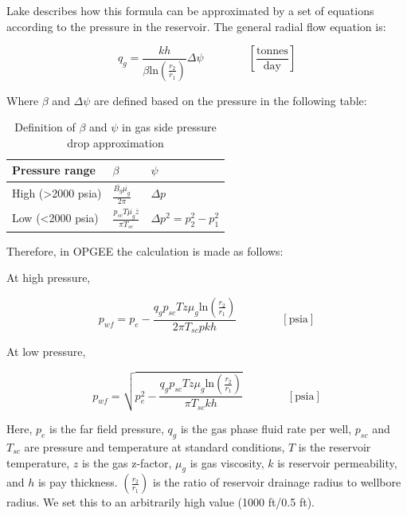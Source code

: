 \documentclass[11pt]{report}
\newcommand{\eqnunit}[1]{\quad\quad \scriptstyle{\left[\text{#1}\right]}}
\newcommand{\eqnunitfrac}[2]{\quad\quad \scriptstyle{\left[\frac{\text{#1}}{\text{#2}}\right]}}
\begin{document}
Lake describes how this formula can be approximated by a set of equations according to the pressure in the reservoir. The general radial flow equation is:

\begin{equation} 
q_{g} = \frac{k h}{\beta \text{ln}\left(\frac{r_2}{r_1} \right)} \Delta \psi \quad\quad\eqnunitfrac{tonnes}{day}
\end{equation}

Where $\beta$ and $\Delta \psi$ are defined based on the pressure in the following table:

\begin{table}[h]
\begin{scriptsize}
\caption{Definition of $\beta$ and $\psi$ in gas side pressure drop approximation}
\begin{tabular*}{0.8\columnwidth}{p{}p{}p{}}
\toprule
Pressure range & $\beta$ & $\psi$ \\
\midrule
High (>2000 psia) & $\frac{\overline{B_g}\overline{\mu_g}}{2\pi}$ & $\Delta p$ \\
Low (<2000 psia) & $\frac{p_{sc} T \overline{\mu_g} \overline{z}}{\pi T_{sc}}$ & $\Delta p^2 = p_2^2 - p_1^2$ \\
\bottomrule
\end{tabular*}
\end{scriptsize}
\end{table}

Therefore, in OPGEE the calculation is made as follows:

At high pressure,

\begin{equation} 
p_{wf} = p_e - \frac{q_g p_{sc} T z \mu_g \text{ln}\left(\frac{r_2}{r_1} \right)}{2 \pi T_{sc} p k h} \quad\quad\eqnunit{psia}
\end{equation}

At low pressure,

\begin{equation} 
p_{wf} = \sqrt{p_e^2 - \frac{q_g p_{sc} T z \mu_g \text{ln}\left(\frac{r_2}{r_1} \right)}{\pi T_{sc} k h}} \quad\quad\eqnunit{psia}
\end{equation}

Here, $p_e$ is the far field pressure, $q_g$ is the gas phase fluid rate per well, $p_{sc}$ and $T_{sc}$ are pressure and temperature at standard conditions, $T$ is the reservoir temperature, $z$ is the gas z-factor, $\mu_g$ is gas viscosity, $k$ is reservoir permeability, and $h$ is pay thickness. $\left(\frac{r_2}{r_1} \right)$ is the ratio of reservoir drainage radius to wellbore radius. We set this to an arbitrarily high value (1000 ft/0.5 ft).
\end{document}
